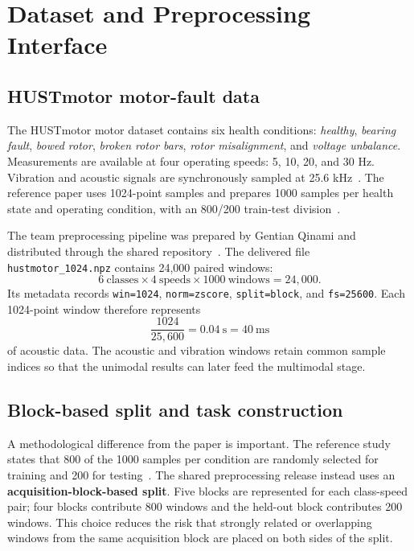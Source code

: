 \documentclass[10pt,a4paper,twocolumn]{article}
\begin{document}
\section{Dataset and Preprocessing Interface}

\subsection{HUSTmotor motor-fault data}

The HUSTmotor motor dataset contains six health conditions: \textit{healthy}, \textit{bearing fault}, \textit{bowed rotor}, \textit{broken rotor bars}, \textit{rotor misalignment}, and \textit{voltage unbalance}. Measurements are available at four operating speeds: 5, 10, 20, and 30 Hz. Vibration and acoustic signals are synchronously sampled at 25.6 kHz~\cite{zhao2025,hustdataset}. The reference paper uses 1024-point samples and prepares 1000 samples per health state and operating condition, with an 800/200 train-test division~\cite{zhao2025}.

The team preprocessing pipeline was prepared by Gentian Qinami and distributed through the shared repository~\cite{gentirepo}. The delivered file \texttt{hustmotor\_1024.npz} contains 24,000 paired windows:
\[
6\ \text{classes}\times4\ \text{speeds}\times1000\ \text{windows}=24{,}000.
\]
Its metadata records \texttt{win=1024}, \texttt{norm=zscore}, \texttt{split=block}, and \texttt{fs=25600}. Each 1024-point window therefore represents
\[
\frac{1024}{25{,}600}=0.04\ \text{s}=40\ \text{ms}
\]
of acoustic data. The acoustic and vibration windows retain common sample indices so that the unimodal results can later feed the multimodal stage.

\subsection{Block-based split and task construction}

A methodological difference from the paper is important. The reference study states that 800 of the 1000 samples per condition are randomly selected for training and 200 for testing~\cite{zhao2025}. The shared preprocessing release instead uses an \textbf{acquisition-block-based split}. Five blocks are represented for each class-speed pair; four blocks contribute 800 windows and the held-out block contributes 200 windows. This choice reduces the risk that strongly related or overlapping windows from the same acquisition block are placed on both sides of the split.
\end{document}
